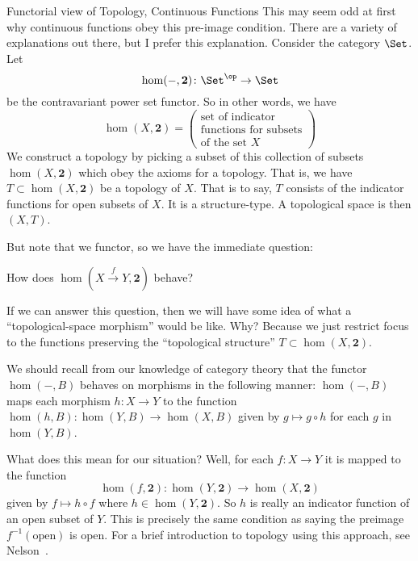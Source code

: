 \begin{Boxed}{Functorial view of Topology, Continuous Functions}
This may seem odd at first why continuous functions obey this
pre-image condition. There are a variety of explanations out
there, but I prefer this explanation. Consider the category
$\Set$. Let
\begin{equation}
\hom(-,\mathbf{2})\colon\Set^{\op}\to\Set
\end{equation}
be the contravariant power set functor. So in other words, we
have
\begin{equation}
\hom(X,\mathbf{2})=\begin{pmatrix}\mbox{set of indicator}\\
\mbox{functions for subsets}\\
\mbox{of the set $X$}
\end{pmatrix}
\end{equation}
We construct a topology by picking a subset of this collection of
subsets $\hom(X,\mathbf{2})$ which obey the axioms for a
topology. That is, we have $T\subset\hom(X,\mathbf{2})$ be a
topology of $X$. That is to say, $T$ consists of the indicator
functions for open subsets of $X$. It is a structure-type.
A topological space is then $(X,T)$. 

But note that we functor, so we have the immediate question:
\begin{quest}
How does $\hom(X\xrightarrow{\;f\;}Y,\mathbf{2})$ behave?
\end{quest}
If we can answer this question, then we will have some idea of
what a ``topological-space morphism'' would be like. Why? Because
we just restrict focus to the functions preserving the
``topological structure'' $T\subset\hom(X,\mathbf{2})$.

We should recall from our knowledge of category theory that the
functor $\hom(-,B)$ behaves on morphisms in the following manner:
$\hom(-,B)$ maps each morphism $h\colon X\to Y$ to the function
$\hom(h, B)\colon \hom(Y, B)\to\hom(X, B)$ given by $g \mapsto
g\circ h$ for each $g$ in $\hom(Y, B)$.  

What does this mean for our situation? Well, for each $f\colon
X\to Y$ it is mapped to the function 
\begin{equation}
\hom(f,\mathbf{2})\colon\hom(Y,\mathbf{2})\to\hom(X,\mathbf{2})
\end{equation}
given by $f\mapsto h\circ f$ where $h\in\hom(Y,\mathbf{2})$. So
$h$ is really an indicator function of an open subset of
$Y$. This is precisely the same condition as saying the preimage
$f^{-1}(\mbox{open})$ is open.
For a brief introduction to topology using this approach, see Nelson~\cite{nelson}.
\end{Boxed}

